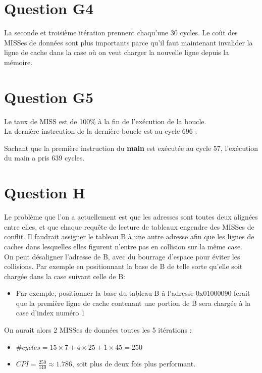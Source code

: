 \documentclass[10pt]{article}
\begin{document}
\section{Question G4}
La seconde et troisième itération prennent chaqu'une 30 cycles. Le coût des
MISSes de données sont plus importants parce qu'il faut maintenant invalider la
ligne de cache dans la case où on veut charger la nouvelle ligne depuis la
mémoire.

\section{Question G5}
Le taux de MISS est de 100\% à la fin de l'exécution de la boucle.\\
La dernière instrcution de la dernière boucle est au cycle 696 :

Sachant que la première instruction du {\bf main} est exécutée au cycle 57,
l'exécution du main a pris 639 cycles.

\section{Question H}
Le problème que l'on a actuellement est que les adresses sont toutes deux
alignées entre elles, et que chaque requête de lecture de tableaux engendre des
MISSes de conflit. Il faudrait assigner le tableau B à une autre adresse afin
que les lignes de caches dans lesquelles elles figurent n'entre pas en collision
sur la même case.\\
On peut désaligner l'adresse de B, avec du bourrage d'espace pour éviter les
collisions. Par exemple en positionnant la base de B de telle sorte qu'elle soit
chargée dans la case suivant celle de B:\\
\begin{itemize}
  \item Par exemple, positionner la base du tableau B à l'adresse 0x01000090
  ferait que la première ligne de cache contenant une portion de B sera chargée
  à la case d'index numéro 1
\end{itemize}
On aurait alors 2 MISSes de données toutes les 5 itérations :
\begin{itemize}
  \item $\#cycles={15}\times{7}+{4}\times{25}+{1}\times{45}=250$
  \item ${CPI}=\frac{250}{140}\approx{1.786}$, soit plus de deux fois plus
  performant.
\end{itemize}
\end{document}
